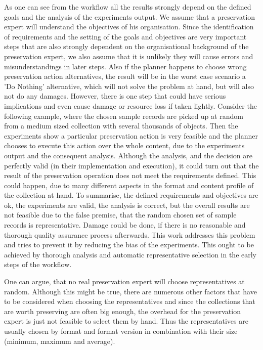 As one can see from the workflow all the results strongly depend on the defined goals and the analysis of the experiments output. We assume that a preservation expert will understand the objectives of his organisation. Since the identification of requirements and the setting of the goals and objectives are very important steps that are also strongly dependent on the organisational background of the preservation expert, we also assume that it is unlikely they will cause errors and misunderstandings in later steps. Also if the planner happens to choose wrong preservation action alternatives, the result will be in the worst case scenario a 'Do Nothing' alternative, which will not solve the problem at hand, but will also not do any damages.
However, there is one step that could have serious implications and even cause damage or resource loss if taken lightly. Consider the following example, where the chosen sample records are picked up at random from a medium sized collection with several thousands of objects. Then the experiments show a particular preservation action is very feasible and the planner chooses to execute this action over the whole content, due to the experiments output and the consequent analysis. Although the analysis, and the decision are perfectly valid (in their implementation and execution), it could turn out that the result of the preservation operation does not meet the requirements defined. This could happen, due to many different aspects in the format and content profile of the collection at hand. To summarise, the defined requirements and objectives are ok, the experiments are valid, the analysis is correct, but the overall results are not feasible due to the false premise, that the random chosen set of sample records is representative. Damage could be done, if there is no reasonable and thorough quality assurance process afterwards. This work addresses this problem and tries to prevent it by reducing the bias of the experiments. This ought to be achieved by thorough analysis and automatic representative selection in the early steps of the workflow.

One can argue, that no real preservation expert will choose representatives at random. Although this might be true, there are numerous other factors that have to be considered when choosing the representatives and since the collections that are worth preserving are often big enough, the overhead for the preservation expert is just not feasible to select them by hand. Thus the representatives are usually chosen by format and format version in combination with their size (minimum, maximum and average).

